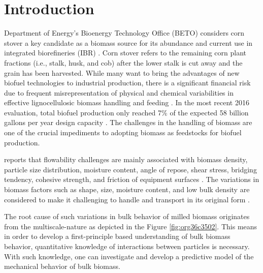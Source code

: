 \documentclass[xcolor=dvipsnames,10pt,hidelinks]{article}
\begin{document}
\section{Introduction}
\label{sec:orgcb98b32}
Department of Energy's Bioenergy Technology Office (BETO) considers corn stover a key candidate as a biomass source for its abundance and current use in integrated biorefineries (IBR) \citep{doyle_integrated_2014,usdoe_u.s._2011,langholtz_2016_2016,perlack_us_2011}. Corn stover refers to the remaining corn plant fractions (i.e., stalk, husk, and cob) after the lower stalk is cut away and the grain has been harvested.
While many want to bring the advantages of new biofuel technologies to industrial production, there is a significant financial risk due to frequent misrepresentation of physical and chemical variabilities in effective lignocellulosic biomass handling and feeding \citep{crawford_effects_2016,ray_multiscale_2020,Ray_BiomassBlendingDensification_2017}.
In the most recent 2016 evaluation, total biofuel production only reached 7\% of the expected 58 billion gallons per year design capacity \citep{westover_biomass_2018}.
The challenges in the handling of biomass are one of the crucial impediments to adopting biomass as feedstocks for biofuel production.

\citet{beto_biorefinery_2016} reports that flowability challenges are mainly associated with biomass density, particle size distribution, moisture content, angle of repose, shear stress, bridging tendency, cohesive strength, and friction of equipment surfaces \citep{westover_biomass_2018}.
The variations in biomass factors such as shape, size, moisture content, and low bulk density are considered to make it challenging to handle and transport in its original form \citep{kaliyan_roll_2009}.

The root cause of such variations in bulk behavior of milled biomass originates from the multiscale-nature as depicted in the Figure \ref{fig:org36c3502}.
This means in order to develop a first-principle based understanding of bulk biomass behavior, quantitative knowledge of interactions between particles is necessary.
With such knowledge, one can investigate and develop a predictive model of the mechanical behavior of bulk biomass.
\end{document}
